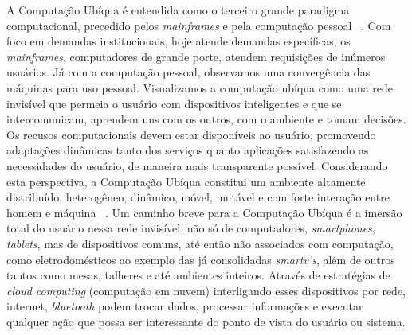 \documentclass[12pt,a4paper,compsoc]{IEEEtran}
\begin{document}
A Computação Ubíqua é entendida como o terceiro grande paradigma computacional, precedido pelos \textit{mainframes} e pela computação pessoal ~\cite{Weiser97}. Com foco em demandas institucionais, hoje atende demandas específicas, os \textit{mainframes}, computadores de grande porte, atendem requisições de inúmeros usuários. Já com a computação pessoal, observamos uma convergência das máquinas para uso pessoal.
Visualizamos a computação ubíqua como uma rede invisível que permeia o usuário com dispositivos inteligentes e que se intercomunicam, aprendem uns com os outros, com o ambiente e tomam decisões. Os recusos computacionais devem estar disponíveis ao usuário, promovendo adaptações dinâmicas tanto dos serviços quanto aplicações satisfazendo as necessidades do usuário, de maneira mais transparente possível. Considerando esta perspectiva, a Computação Ubíqua constitui um ambiente altamente distribuído, heterogêneo, dinâmico, móvel, mutável e com forte interação entre homem e máquina ~\cite{Augustin03}.        
Um caminho breve para a Computação Ubíqua é a imersão total do usuário nessa rede invisível, não só de computadores, \textit{smartphones}, \textit{tablets}, mas de dispositivos comuns, até então não associados com computação, como eletrodomésticos ao exemplo das já consolidadas \textit{smartv's}, além de outros tantos como mesas, talheres e até ambientes inteiros. Através de estratégias de \textit{cloud computing} (computação em nuvem) interligando esses dispositivos por rede, internet, \textit{bluetooth} podem trocar dados, processar informações e executar qualquer ação que possa ser interessante do ponto de vista do usuário ou sistema.



\end{document}
